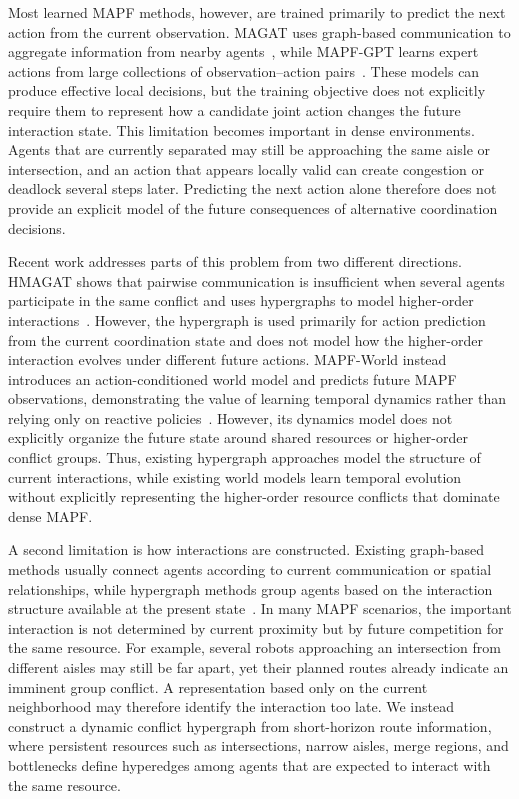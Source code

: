 \documentclass{article} %
\begin{document}
Most learned MAPF methods, however, are trained primarily to predict the next action from the current observation. MAGAT uses graph-based communication to aggregate information from nearby agents~\cite{li2021magat}, while MAPF-GPT learns expert actions from large collections of observation--action pairs~\cite{andreychuk2025mapf}. These models can produce effective local decisions, but the training objective does not explicitly require them to represent how a candidate joint action changes the future interaction state. This limitation becomes important in dense environments. Agents that are currently separated may still be approaching the same aisle or intersection, and an action that appears locally valid can create congestion or deadlock several steps later. Predicting the next action alone therefore does not provide an explicit model of the future consequences of alternative coordination decisions.

Recent work addresses parts of this problem from two different directions. HMAGAT shows that pairwise communication is insufficient when several agents participate in the same conflict and uses hypergraphs to model higher-order interactions~\cite{jain2026hmagat}. However, the hypergraph is used primarily for action prediction from the current coordination state and does not model how the higher-order interaction evolves under different future actions. MAPF-World instead introduces an action-conditioned world model and predicts future MAPF observations, demonstrating the value of learning temporal dynamics rather than relying only on reactive policies~\cite{yang2025mapfworld}. However, its dynamics model does not explicitly organize the future state around shared resources or higher-order conflict groups. Thus, existing hypergraph approaches model the structure of current interactions, while existing world models learn temporal evolution without explicitly representing the higher-order resource conflicts that dominate dense MAPF.

A second limitation is how interactions are constructed. Existing graph-based methods usually connect agents according to current communication or spatial relationships, while hypergraph methods group agents based on the interaction structure available at the present state~\cite{li2021magat,jain2026hmagat}. In many MAPF scenarios, the important interaction is not determined by current proximity but by future competition for the same resource. For example, several robots approaching an intersection from different aisles may still be far apart, yet their planned routes already indicate an imminent group conflict. A representation based only on the current neighborhood may therefore identify the interaction too late. We instead construct a dynamic conflict hypergraph from short-horizon route information, where persistent resources such as intersections, narrow aisles, merge regions, and bottlenecks define hyperedges among agents that are expected to interact with the same resource.
\end{document}
